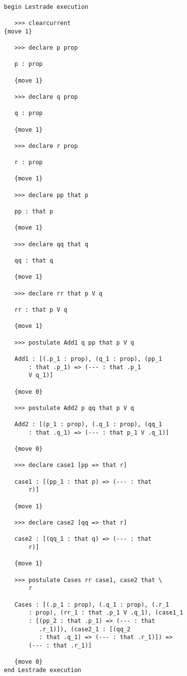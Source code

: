 \documentclass[12pt]{article}
\begin{document}
\begin{verbatim}

begin Lestrade execution

   >>> clearcurrent
{move 1}

   >>> declare p prop

   p : prop

   {move 1}

   >>> declare q prop

   q : prop

   {move 1}

   >>> declare r prop

   r : prop

   {move 1}

   >>> declare pp that p

   pp : that p

   {move 1}

   >>> declare qq that q

   qq : that q

   {move 1}

   >>> declare rr that p V q

   rr : that p V q

   {move 1}

   >>> postulate Add1 q pp that p V q

   Add1 : [(.p_1 : prop), (q_1 : prop), (pp_1 
       : that .p_1) => (--- : that .p_1 
       V q_1)]

   {move 0}

   >>> postulate Add2 p qq that p V q

   Add2 : [(p_1 : prop), (.q_1 : prop), (qq_1 
       : that .q_1) => (--- : that p_1 V .q_1)]

   {move 0}

   >>> declare case1 [pp => that r]

   case1 : [(pp_1 : that p) => (--- : that 
       r)]

   {move 1}

   >>> declare case2 [qq => that r]

   case2 : [(qq_1 : that q) => (--- : that 
       r)]

   {move 1}

   >>> postulate Cases rr case1, case2 that \
       r

   Cases : [(.p_1 : prop), (.q_1 : prop), (.r_1 
       : prop), (rr_1 : that .p_1 V .q_1), (case1_1 
       : [(pp_2 : that .p_1) => (--- : that 
          .r_1)]), (case2_1 : [(qq_2 
          : that .q_1) => (--- : that .r_1)]) => 
       (--- : that .r_1)]

   {move 0}
end Lestrade execution
\end{verbatim}
\end{document}
